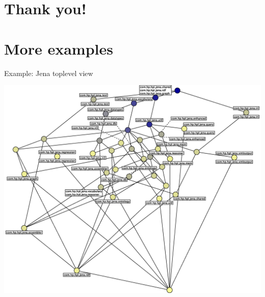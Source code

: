 \documentclass[pdf,prettybox]{prosper}
\begin{document}
\part{Thank you!}

\part{More examples}

\begin{slide}{Example: Jena toplevel view}
 \begin{center}
 \includegraphics[width = \textwidth]{img/jenaToplevelDependencies.eps}
\end{center}
\end{slide}
\end{document}

